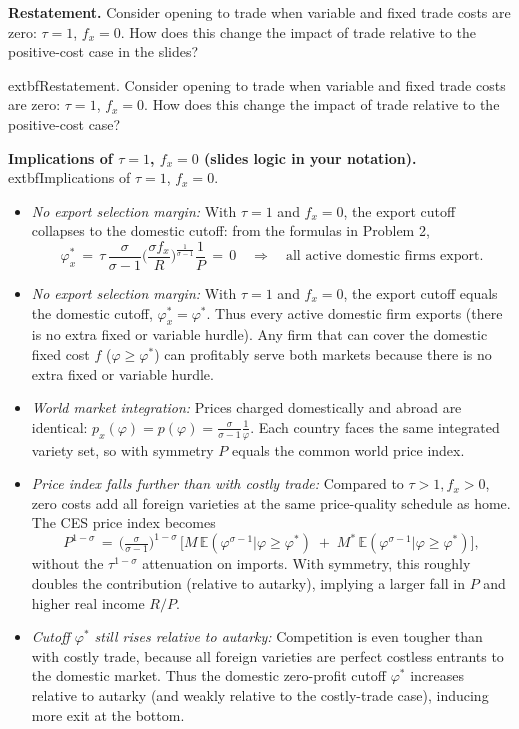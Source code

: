 \begin{solution}
	\textbf{Restatement.} Consider opening to trade when variable and fixed trade costs are zero: $\tau=1$, $f_x=0$. How does this change the impact of trade relative to the positive-cost case in the slides?
\begin{solution}
    	extbf{Restatement.} Consider opening to trade when variable and fixed trade costs are zero: $\tau=1$, $f_x=0$. How does this change the impact of trade relative to the positive-cost case?

\bigskip
	\textbf{Implications of $\tau=1$, $f_x=0$ (slides logic in your notation).}
		extbf{Implications of $\tau=1$, $f_x=0$.}
\begin{itemize}
	\item \emph{No export selection margin:} With $\tau=1$ and $f_x=0$, the export cutoff collapses to the domestic cutoff: from the formulas in Problem 2,
	\[
		\varphi_x^* \,=\, \tau\, \frac{\sigma}{\sigma-1}\Big(\frac{\sigma f_x}{R}\Big)^{\!\tfrac{1}{\sigma-1}} \frac{1}{P} \,=\, 0 \quad \Rightarrow \quad \text{all active domestic firms export.}
	\]
	\item \emph{No export selection margin:} With $\tau=1$ and $f_x=0$, the export cutoff equals the domestic cutoff, $\varphi_x^*=\varphi^*$. Thus every active domestic firm exports (there is no extra fixed or variable hurdle).
	Any firm that can cover the domestic fixed cost $f$ ($\varphi\ge \varphi^*$) can profitably serve both markets because there is no extra fixed or variable hurdle.
	\item \emph{World market integration:} Prices charged domestically and abroad are identical: $p_x(\varphi)=p(\varphi)=\tfrac{\sigma}{\sigma-1}\tfrac{1}{\varphi}$. Each country faces the same integrated variety set, so with symmetry $P$ equals the common world price index.
	\item \emph{Price index falls further than with costly trade:} Compared to $\tau>1, f_x>0$, zero costs add all foreign varieties at the same price-quality schedule as home. The CES price index becomes
	\[
		P^{1-\sigma} \,=\, \Big(\tfrac{\sigma}{\sigma-1}\Big)^{1-\sigma}\,\Big[ M\, \mathbb{E}(\varphi^{\sigma-1}|\varphi\ge \varphi^*) \; + \; M^*\, \mathbb{E}(\varphi^{\sigma-1}|\varphi\ge \varphi^*) \Big],
	\]
	without the $\tau^{1-\sigma}$ attenuation on imports. With symmetry, this roughly doubles the contribution (relative to autarky), implying a larger fall in $P$ and higher real income $R/P$.
	\item \emph{Cutoff $\varphi^*$ still rises relative to autarky:} Competition is even tougher than with costly trade, because all foreign varieties are perfect costless entrants to the domestic market. Thus the domestic zero-profit cutoff $\varphi^*$ increases relative to autarky (and weakly relative to the costly-trade case), inducing more exit at the bottom.

\end{itemize}
\end{solution}
\end{solution}
